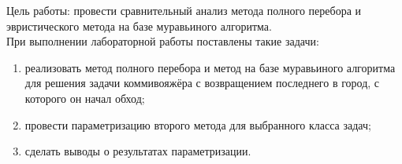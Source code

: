 \Introduction
Цель работы: провести сравнительный анализ метода полного перебора и эвристического метода на базе муравьиного алгоритма.\\
При выполнении лабораторной работы поставлены такие задачи:
\begin{enumerate}[1)]
	\item реализовать метод полного перебора и метод на базе муравьиного алгоритма для решения задачи коммивояжёра с возвращением последнего в город, с которого он начал обход;
	\item провести параметризацию второго метода для выбранного класса задач;
	\item сделать выводы о результатах параметризации.
\end{enumerate}